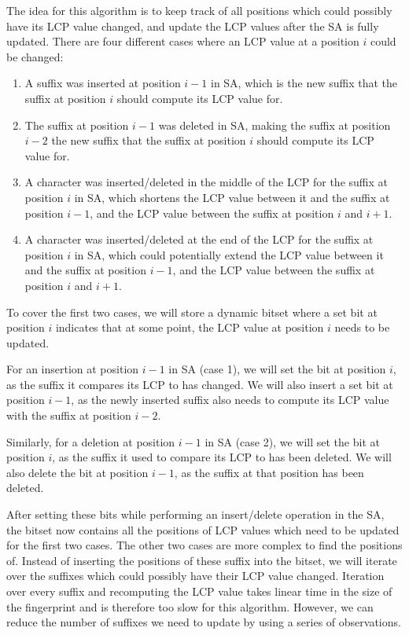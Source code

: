 The idea for this algorithm is to keep track of all positions which could possibly have
its LCP value changed, and update the LCP values after the SA is fully updated. There are
four different cases where an LCP value at a position $i$ could be changed:

\begin{enumerate}
    \item A suffix was inserted at position $i - 1$ in SA, which is the new suffix that
        the suffix at position $i$ should compute its LCP value for.

    \item The suffix at position $i - 1$ was deleted in SA, making the suffix at position
        $i - 2$ the new suffix that the suffix at position $i$ should compute its LCP
        value for.

    \item A character was inserted/deleted in the middle of the LCP for the suffix at
        position $i$ in SA, which shortens the LCP value between it and the suffix at
        position $i - 1$, and the LCP value between the suffix at position $i$ and $i + 1$.

    \item A character was inserted/deleted at the end of the LCP for the suffix at
        position $i$ in SA, which could potentially extend the LCP value between it and
        the suffix at position $i - 1$, and the LCP value between the suffix at position
        $i$ and $i + 1$.

\end{enumerate}

To cover the first two cases, we will store a dynamic bitset where a set bit at position
$i$ indicates that at some point, the LCP value at position $i$ needs to be updated.

For an insertion at position $i - 1$ in SA (case 1), we will set the bit at position $i$,
as the suffix it compares its LCP to has changed. We will also insert a set bit at
position $i - 1$, as the newly inserted suffix also needs to compute its LCP value with
the suffix at position $i - 2$.

Similarly, for a deletion at position $i - 1$ in SA (case 2), we will set the bit at
position $i$, as the suffix it used to compare its LCP to has been deleted. We will also
delete the bit at position $i - 1$, as the suffix at that position has been deleted.

After setting these bits while performing an insert/delete operation in the SA, the bitset
now contains all the positions of LCP values which need to be updated for the first two
cases. The other two cases are more complex to find the positions of. Instead of inserting
the positions of these suffix into the bitset, we will iterate over the suffixes which
could possibly have their LCP value changed. Iteration over every suffix and recomputing
the LCP value takes linear time in the size of the fingerprint and is therefore too slow
for this algorithm. However, we can reduce the number of suffixes we need to update by
using a series of observations.

